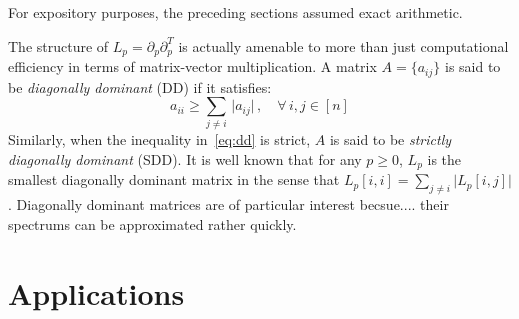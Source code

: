 \documentclass[10pt]{article}
\newcommand{\+}{%
	\raisebox{0.18ex}{\scaleobj{0.55}{+}}
}
\theoremstyle{definition}
\begin{document}
For expository purposes, the preceding sections assumed exact arithmetic. 


The structure of $L_p = \partial_p \partial_p^T$ is actually amenable to more than just computational efficiency in terms of matrix-vector multiplication. A matrix $A = \{ a_{ij} \}$ is said to be \emph{diagonally dominant} (DD) if it satisfies: 
\begin{equation}\label{eq:dd}
a_{ii} \geq \sum\limits_{j \neq i} \, \lvert a_{ij} \rvert \,, \quad \forall \, i,j \in [n]
\end{equation}  
Similarly, when the inequality in~\eqref{eq:dd} is strict, $A$ is said to be \emph{strictly diagonally dominant} (SDD). 
It is well known that for any $p \geq 0$, $L_p$ is the smallest diagonally dominant matrix in the sense that $L_p[i,i] = \sum\limits_{j \neq i} \lvert L_p[i,j] \rvert$. Diagonally dominant matrices are of particular interest becsue.... their spectrums can be approximated rather quickly. 










%

\section{Applications}\label{sec:applications}

\newpage
\end{document}
